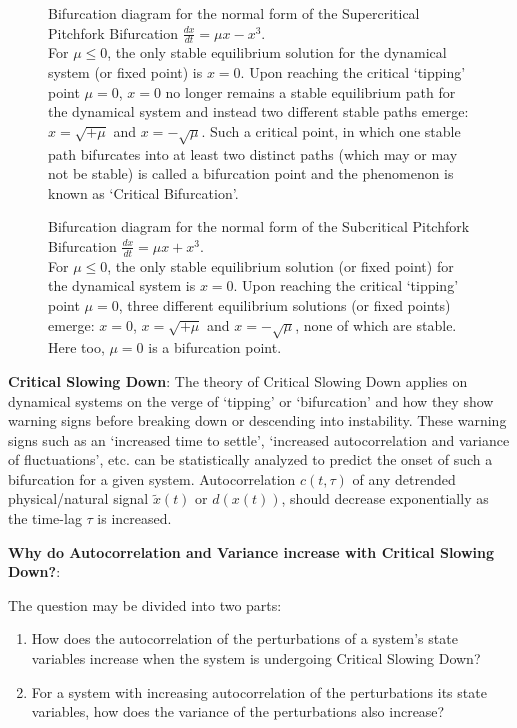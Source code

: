 \begin{figure}[!ht]
	\caption{Bifurcation diagram for the normal form of the Supercritical Pitchfork Bifurcation $\frac{dx}{dt} = \mu x - x^3$. \\ For $\mu \leq 0$, the only stable equilibrium solution for the dynamical system (or fixed point) is $x=0$. Upon reaching the critical `tipping' point $\mu=0$, $x=0$ no longer remains a stable equilibrium path for the dynamical system and instead two different stable paths emerge: $x = \sqrt{+\mu}$ and $x = -\sqrt{\mu}$. Such a critical point, in which one stable path bifurcates into at least two distinct paths (which may or may not be stable) is called a bifurcation point and the phenomenon is known as `Critical Bifurcation'.}
	\label{fig:bifPitchforkSupercritical}
\end{figure}

\begin{figure}[!ht]
	\caption{Bifurcation diagram for the normal form of the Subcritical Pitchfork Bifurcation $\frac{dx}{dt} = \mu x + x^3$. \\ For $\mu \leq 0$, the only stable equilibrium solution (or fixed point) for the dynamical system is $x=0$. Upon reaching the critical `tipping' point $\mu=0$, three different equilibrium solutions (or fixed points) emerge: $x=0$, $x = \sqrt{+\mu}$ and $x = -\sqrt{\mu}$, none of which are stable. Here too, $\mu=0$ is a bifurcation point.}
	\label{fig:bifPitchforkSubcritical}
\end{figure}


\textbf{Critical Slowing Down}: The theory of Critical Slowing Down applies on dynamical systems on the verge of `tipping' or `bifurcation' and how they show warning signs before breaking down or descending into instability. These warning signs such as an `increased time to settle', `increased autocorrelation and variance of fluctuations', etc. \cite{schefferEarlyWarningSignalsForCriticalTransitions} can be statistically analyzed to predict the onset of such a bifurcation for a given system.
Autocorrelation $c(t, \tau)$ of any detrended physical/natural signal $\tilde{x}(t)$ or $d(x(t))$, should decrease exponentially as the time-lag $\tau$ is increased.

\textbf{Why do Autocorrelation and Variance increase with Critical Slowing Down?}:

The question may be divided into two parts:
\begin{enumerate}
	\item How does the autocorrelation of the perturbations of a system's state variables increase when the system is undergoing Critical Slowing Down?
	\item For a system with increasing autocorrelation of the perturbations its state variables, how does the variance of the perturbations also increase?
\end{enumerate}

